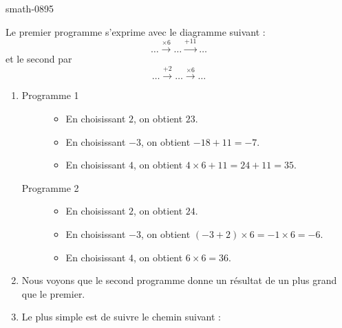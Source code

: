 
\begin{corrige}{smath-0895}

    Le premier programme s'exprime avec le diagramme suivant :
    \begin{equation}
        \boxed{\ldots}\stackrel{\times 6}{\longrightarrow}\boxed{\ldots}\stackrel{+11}{\longrightarrow}\boxed{\ldots}
    \end{equation}
    et le second par
    \begin{equation}
        \boxed{\ldots}\stackrel{+2}{\longrightarrow}\boxed{\ldots}\stackrel{\times 6}{\longrightarrow}\boxed{\ldots}
    \end{equation}
    \begin{enumerate}
        \item
            \begin{description}
                \item[Programme 1]
                    \begin{itemize}
                        \item En choisissant \( 2\), on obtient \( 23\).
                        \item En choisissant \( -3\), on obtient \( -18+11=-7\).
                        \item En choisissant \( 4\), on obtient \( 4\times 6+11=24+11=35\).
                    \end{itemize}
                \item[Programme 2]
                    \begin{itemize}
                        \item En choisissant \( 2\), on obtient \( 24\).
                        \item En choisissant \( -3\), on obtient \( (-3+2)\times 6=-1\times 6=-6 \).
                        \item En choisissant \( 4\), on obtient \( 6\times 6=36\).
                    \end{itemize}
            \end{description}
        \item
            Nous voyons que le second programme donne un résultat de un plus grand que le premier.
        \item
            Le plus simple est de suivre le chemin suivant :
    \begin{equation}

\end{equation}
\end{enumerate}
\end{corrige}
